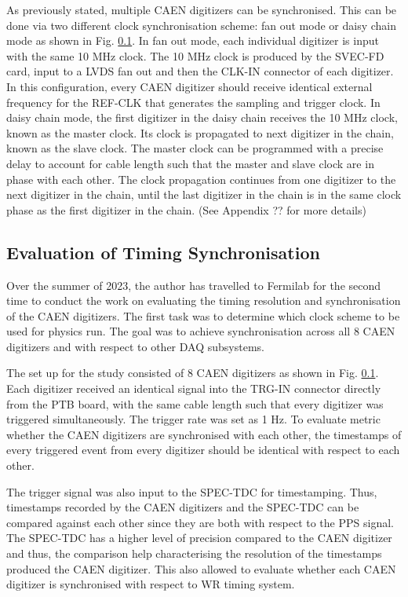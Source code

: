 As previously stated, multiple CAEN digitizers can be synchronised. 
This can be done via two different clock synchronisation scheme: fan out mode or daisy chain mode as shown in Fig. \ref{}.
In fan out mode, each individual digitizer is input with the same 10 MHz clock.
The 10 MHz clock is produced by the SVEC-FD card, input to a LVDS fan out and then the CLK-IN connector of each digitizer.
In this configuration, every CAEN digitizer should receive identical external frequency for the REF-CLK that generates the sampling and trigger clock.
In daisy chain mode, the first digitizer in the daisy chain receives the 10 MHz clock, known as the master clock.
Its clock is propagated to next digitizer in the chain, known as the slave clock.
The master clock can be programmed with a precise delay to account for cable length such that the master and slave clock are in phase with each other.
The clock propagation continues from one digitizer to the next digitizer in the chain, until the last digitizer in the chain is in the same clock phase as the first digitizer in the chain. (See Appendix ?? for more details) 

\subsection{Evaluation of Timing Synchronisation}

Over the summer of 2023, the author has travelled to Fermilab for the second time to conduct the work on evaluating the timing resolution and synchronisation of the CAEN digitizers.
The first task was to determine which clock scheme to be used for physics run. 
The goal was to achieve synchronisation across all 8 CAEN digitizers and with respect to other DAQ subsystems.

The set up for the study consisted of 8 CAEN digitizers as shown in Fig. \ref{}. 
Each digitizer received an identical signal into the TRG-IN connector directly from the PTB board, with the same cable length such that every digitizer was triggered simultaneously.
The trigger rate was set as 1 Hz.
To evaluate metric whether the CAEN digitizers are synchronised with each other, the timestamps of every triggered event from every digitizer should be identical with respect to each other. 

The trigger signal was also input to the SPEC-TDC for timestamping.
Thus, timestamps recorded by the CAEN digitizers and the SPEC-TDC can be compared against each other since they are both with respect to the PPS signal.
The SPEC-TDC has a higher level of precision compared to the CAEN digitizer and thus, the comparison help characterising the resolution of the timestamps produced the CAEN digitizer. 
This also allowed to evaluate whether each CAEN digitizer is synchronised with respect to WR timing system.

